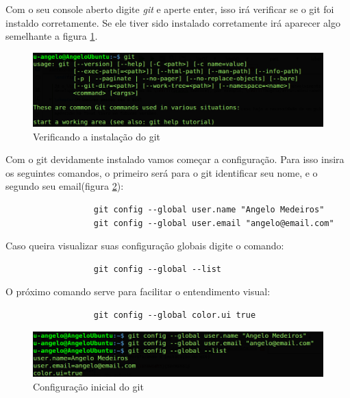 \documentclass[12pt,openright,oneside,a4paper,english,brazil]{abntex2}
\begin{document}
Com o seu console aberto digite \textit{git} e aperte enter, isso irá verificar se o git foi instaldo corretamente. Se ele tiver sido instalado corretamente irá aparecer algo semelhante a figura \ref{terminal}.

\begin{figure}[h]
	\caption{\label{terminal}Verificando a instalação do git}
	\begin{center}
		\includegraphics[width=1\linewidth]{imagens/terminal}
	\end{center}
\end{figure}

Com o git devidamente instalado vamos começar a configuração. Para isso insira os seguintes comandos, o primeiro será para o git identificar seu nome, e o segundo seu email(figura \ref{configuracao}):

	\begin{verbatim}
		          git config --global user.name "Angelo Medeiros"
		          git config --global user.email "angelo@email.com"
	\end{verbatim}

Caso queira visualizar suas configuração globais digite o comando:

\begin{verbatim}
		          git config --global --list
\end{verbatim}

O próximo comando serve para facilitar o entendimento visual:

		\begin{verbatim}
		          git config --global color.ui true
		\end{verbatim}

\begin{figure}[h]
	\caption{\label{configuracao}Configuração inicial do git}
	\begin{center}
		\includegraphics[width=1\linewidth]{imagens/configuracao}
	\end{center}
\end{figure}
\end{document}
